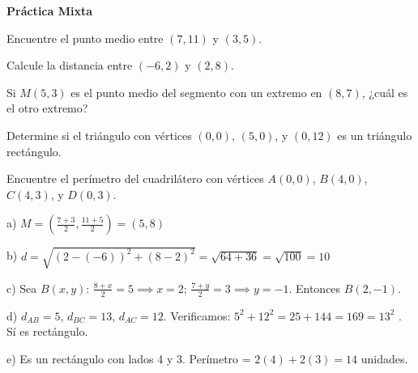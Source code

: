 \begin{exercise}
\textbf{Práctica Mixta}

\begin{exerciselist}
    \item Encuentre el punto medio entre $(7, 11)$ y $(3, 5)$.
    \item Calcule la distancia entre $(-6, 2)$ y $(2, 8)$.
    \item Si $M(5, 3)$ es el punto medio del segmento con un extremo en $(8, 7)$, ¿cuál es el otro extremo?
    \item Determine si el triángulo con vértices $(0, 0)$, $(5, 0)$, y $(0, 12)$ es un triángulo rectángulo.
    \item Encuentre el perímetro del cuadrilátero con vértices $A(0, 0)$, $B(4, 0)$, $C(4, 3)$, y $D(0, 3)$.
\end{exerciselist}

\begin{solucion}
a) $M = \left(\frac{7+3}{2}, \frac{11+5}{2}\right) = (5, 8)$

b) $d = \sqrt{(2-(-6))^2 + (8-2)^2} = \sqrt{64+36} = \sqrt{100} = 10$

c) Sea $B(x,y)$: $\frac{8+x}{2} = 5 \implies x = 2$; $\frac{7+y}{2} = 3 \implies y = -1$. Entonces $B(2, -1)$.

d) $d_{AB} = 5$, $d_{BC} = 13$, $d_{AC} = 12$. Verificamos: $5^2 + 12^2 = 25 + 144 = 169 = 13^2$ \checkmark. Sí es rectángulo.

e) Es un rectángulo con lados 4 y 3. Perímetro = $2(4) + 2(3) = 14$ unidades.
\end{solucion}
\end{exercise}
